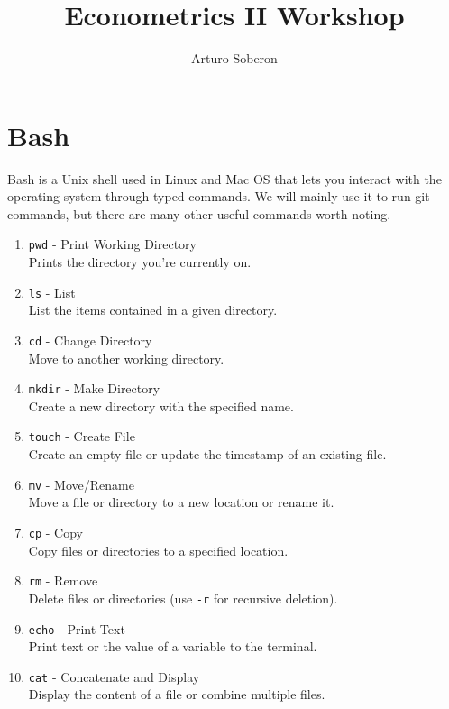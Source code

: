 \documentclass[12pt]{article}
\begin{document}
\title{Econometrics II Workshop}
\author{Arturo Soberon}
\date{}
\maketitle


\setcounter{section}{0}
\section{Bash}
Bash is a Unix shell used in Linux and Mac OS that lets you interact with
the operating system through typed commands. We will mainly use it to run
git commands, but there are many other useful commands worth noting.

\begin{enumerate}
    \item \texttt{pwd} - Print Working Directory \\
        Prints the directory you're currently on.
    \item \texttt{ls} - List \\
        List the items contained in a given directory.
    \item \texttt{cd} - Change Directory \\
        Move to another working directory.
    \item \texttt{mkdir} - Make Directory \\
        Create a new directory with the specified name.
    \item \texttt{touch} - Create File \\
        Create an empty file or update the timestamp of an existing file.
    \item \texttt{mv} - Move/Rename \\
        Move a file or directory to a new location or rename it.
    \item \texttt{cp} - Copy \\
        Copy files or directories to a specified location.
    \item \texttt{rm} - Remove \\
        Delete files or directories (use \texttt{-r} for recursive deletion).
    \item \texttt{echo} - Print Text \\
        Print text or the value of a variable to the terminal.
    \item \texttt{cat} - Concatenate and Display \\
        Display the content of a file or combine multiple files.
\end{enumerate}
\end{document}
